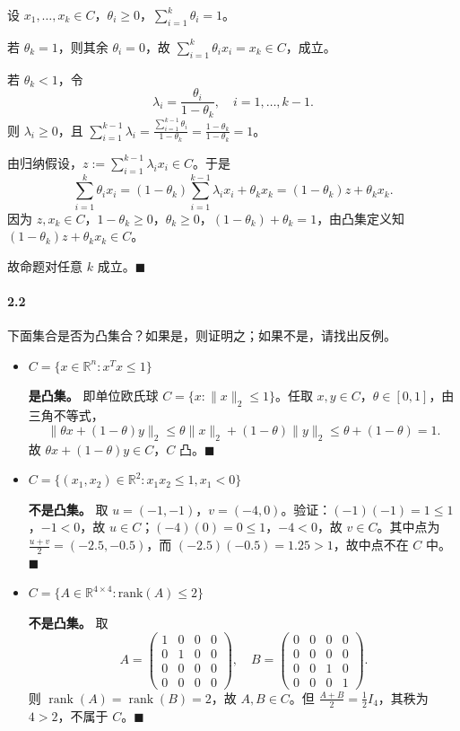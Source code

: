 \documentclass[12pt,a4paper]{article}
\begin{document}
设 $x_1,\dots,x_k\in C$，$\theta_i\ge0$，$\sum_{i=1}^k\theta_i=1$。

若 $\theta_k=1$，则其余 $\theta_i=0$，故 $\sum_{i=1}^k\theta_i x_i = x_k \in C$，成立。

若 $\theta_k < 1$，令
\[
  \lambda_i = \frac{\theta_i}{1-\theta_k}, \quad i=1,\dots,k-1.
\]
则 $\lambda_i\ge0$，且 $\sum_{i=1}^{k-1}\lambda_i = \frac{\sum_{i=1}^{k-1}\theta_i}{1-\theta_k} = \frac{1-\theta_k}{1-\theta_k}=1$。

由归纳假设，$z := \sum_{i=1}^{k-1}\lambda_i x_i \in C$。于是
\[
  \sum_{i=1}^k \theta_i x_i
  = (1-\theta_k)\sum_{i=1}^{k-1}\lambda_i x_i + \theta_k x_k
  = (1-\theta_k)z + \theta_k x_k.
\]
因为 $z, x_k \in C$，$1-\theta_k\ge0$，$\theta_k\ge0$，$(1-\theta_k)+\theta_k=1$，由凸集定义知 $(1-\theta_k)z + \theta_k x_k \in C$。

故命题对任意 $k$ 成立。$\blacksquare$


\paragraph{2.2}
下面集合是否为凸集合？如果是，则证明之；如果不是，请找出反例。
\begin{itemize}
\item[(a)] $C=\{x \in \mathbb{R}^n: x^Tx \leq 1\}$

\textbf{是凸集。} 即单位欧氏球 $C=\{x:\|x\|_2\le1\}$。任取 $x,y\in C$，$\theta\in[0,1]$，由三角不等式，
\[
  \|\theta x+(1-\theta)y\|_2 \le \theta\|x\|_2 + (1-\theta)\|y\|_2 \le \theta+(1-\theta)=1.
\]
故 $\theta x+(1-\theta)y\in C$，$C$ 凸。$\blacksquare$

    \item[(b)] $C =\{(x_1,x_2) \in \mathbb{R}^2 : x_1 x_2 \leq 1, x_1 < 0\}$

\textbf{不是凸集。} 取 $u=(-1,-1)$，$v=(-4,0)$。验证：$(-1)(-1)=1\le1$，$-1<0$，故 $u\in C$；$(-4)(0)=0\le1$，$-4<0$，故 $v\in C$。其中点为 $\frac{u+v}{2}=(-2.5,-0.5)$，而 $(-2.5)(-0.5)=1.25>1$，故中点不在 $C$ 中。$\blacksquare$

    \item[(c)] $C=\{A \in \mathbb{R}^{4 \times 4} : \text{rank}(A) \leq  2\}$

\textbf{不是凸集。} 取
\[
  A=\begin{pmatrix}1&0&0&0\\0&1&0&0\\0&0&0&0\\0&0&0&0\end{pmatrix},\quad
  B=\begin{pmatrix}0&0&0&0\\0&0&0&0\\0&0&1&0\\0&0&0&1\end{pmatrix}.
\]
则 $\operatorname{rank}(A)=\operatorname{rank}(B)=2$，故 $A,B\in C$。但 $\frac{A+B}{2}=\frac{1}{2}I_4$，其秩为 $4>2$，不属于 $C$。$\blacksquare$
\end{itemize}
\end{document}
